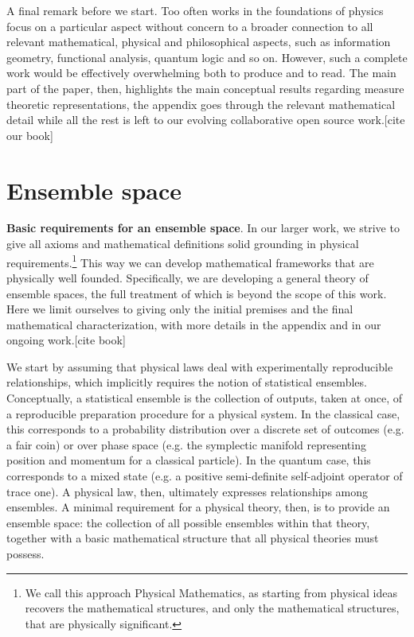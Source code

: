 \documentclass[10pt,twocolumn, nofootinbib]{revtex4-2}
\begin{document}
A final remark before we start. Too often works in the foundations of physics focus on a particular aspect without concern to a broader connection to all relevant mathematical, physical and philosophical aspects, such as information geometry, functional analysis, quantum logic and so on. However, such a complete work would be effectively overwhelming both to produce and to read. The main part of the paper, then, highlights the main conceptual results regarding measure theoretic representations, the appendix goes through the relevant mathematical detail while all the rest is left to our evolving collaborative open source work.[cite our book]

\section{Ensemble space}

\textbf{Basic requirements for an ensemble space}. In our larger work, we strive to give all axioms and mathematical definitions solid grounding in physical requirements.\footnote{We call this approach Physical Mathematics, as starting from physical ideas recovers the mathematical structures, and only the mathematical structures, that are physically significant.} This way we can develop mathematical frameworks that are physically well founded. Specifically, we are developing a general theory of ensemble spaces, the full treatment of which is beyond the scope of this work. Here we limit ourselves to giving only the initial premises and the final mathematical characterization, with more details in the appendix and in our ongoing work.[cite book]

We start by assuming that physical laws deal with experimentally reproducible relationships, which implicitly requires the notion of statistical ensembles. Conceptually, a statistical ensemble is the collection of outputs, taken at once, of a reproducible preparation procedure for a physical system. In the classical case, this corresponds to a probability distribution over a discrete set of outcomes (e.g. a fair coin) or over phase space (e.g. the symplectic manifold representing position and momentum for a classical particle). In the quantum case, this corresponds to a mixed state (e.g. a positive semi-definite self-adjoint operator of trace one). A physical law, then, ultimately expresses relationships among ensembles. A minimal requirement for a physical theory, then, is to provide an ensemble space: the collection of all possible ensembles within that theory, together with a basic mathematical structure that all physical theories must possess.
\end{document}
